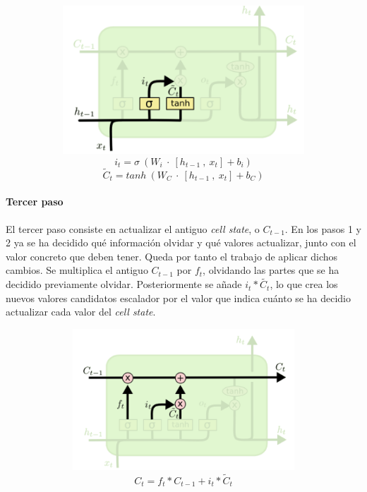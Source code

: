 \documentclass[]{DissertateUSU}
\let\oldparagraph\paragraph
\renewcommand{\paragraph}[1]{\oldparagraph{#1}\mbox{}}
\begin{document}
\centering

\includegraphics[width=6.25in,height=2.1875in]{secondsteplstm.png}
\[i_t = \sigma \ (W_i \ \cdot \ [h_{t-1} \ , \ x_t] + b_i)\]
\[\tilde{C}_t = tanh \ (W_C \ \cdot \ [h_{t-1} \ , \ x_t] + b_C)\]

\centering

\setlength\parskip{7ex}
\justifying

\hypertarget{tercer-paso}{%
\paragraph{Tercer paso}\label{tercer-paso}}

\noindent El tercer paso consiste en actualizar el antiguo \emph{cell
state}, o \(C_{t-1}\). En los pasos 1 y 2 ya se ha decidido qué
información olvidar y qué valores actualizar, junto con el valor
concreto que deben tener. Queda por tanto el trabajo de aplicar dichos
cambios. Se multiplica el antiguo \(C_{t-1}\) por \(f_t\), olvidando las
partes que se ha decidido previamente olvidar. Posteriormente se añade
\(i_t * \tilde{C_{t}}\), lo que crea los nuevos valores candidatos
escalador por el valor que indica cuánto se ha decidio actualizar cada
valor del \emph{cell state}.

\centering

\includegraphics[width=6.25in,height=2.08333in]{thirdsteplstm.png}
\[C_t = f_t * C_{t-1} + i_t * \tilde{C}_t\]
\end{document}

